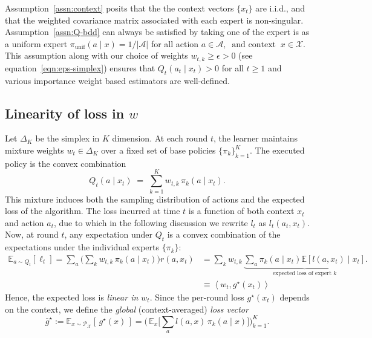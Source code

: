 \documentclass[11pt,letterpaper]{article}
\newcommand{\mycomment}[1]{\textcolor{mypurple}{[#1]}}
\newcommand{\Exs}{\mathbb{E}}
\newcommand{\loss}{\ell}
\theoremstyle{plain}
\theoremstyle{definition}  %
\begin{document}
Assumption~\ref{assn:context} posits that the the context vectors $\{x_t\}$ are i.i.d., and that the weighted covariance matrix associated with each expert is non-singular. Assumption~\ref{assn:Q-bdd} can always be satisfied by taking one of the expert is as a uniform expert $\pi_{\mathrm{unif}}(a \mid x) = 1/|\mathcal{A}|$ for all action $a \in \mathcal{A}, \;\;  \text{and context} \;\; x \in \mathcal{X}$. This assumption along with our choice of weights $w_{t,k} \geq \epsilon > 0$ (see equation~\eqref{eqn:eps-simplex}) ensures that $Q_t(a_t \mid x_t) > 0$ for all $t \geq 1$ and various importance weight based estimators are well-defined. 


\subsection{Linearity of loss in $w$}
%
Let $\Delta_K$ be the simplex in $K$ dimension. At each round $t$, the learner maintains mixture weights $w_t \in \Delta_K$ over a fixed set of base policies $\{\pi_k\}_{k=1}^K$.
The executed policy is the convex combination
\begin{equation}
    Q_t(a \mid x_t)
    \;=\;
    \sum_{k=1}^{K} w_{t,k}\,\pi_k(a \mid x_t).
    \label{eq:mixture-policy}
\end{equation}
This mixture induces both the sampling distribution of actions and the expected loss of the algorithm.
The loss incurred at time $t$ is a function of both context $x_t$ and action $a_t$, due to which in the following discussion we rewrite $l_t$ as $l_t(a_t,x_t)$. Now,
at round $t$, any expectation under $Q_t$ is a convex combination of the expectations under the individual experts $\{\pi_k\}$:
\begin{align}
    \mathbb{E}_{a \sim Q_t}[\loss_t]
    = \sum_{a}\Big(\sum_{k} w_{t,k}\,\pi_k(a \mid x_t)\Big)r(a,x_t)
      &= \sum_{k} w_{t,k}\,\underbrace{\sum_{a}\pi_k(a \mid x_t)\Exs[ l(a,x_t) \mid x_t]}_{\text{expected loss of expert }k}. \\
    &\equiv\left\langle w_t, g^\star(x_t) \right\rangle   
\end{align}
Hence, the expected loss is \emph{linear in $w_t$}.  Since the per-round loss $g^\star(x_t)$ depends on the context, we define the \emph{global} (context-averaged) \emph{loss vector}
\begin{equation}
    \bar g^\star
    := \mathbb{E}_{x\sim\mathcal{P_X}}[\,g^\star(x)\,]
    = \Big(\,\mathbb{E}_{x}\!\big[\sum_a l(a,x)\,\pi_k(a\mid x)\big]\Big)_{k=1}^K.
    \label{eq:gbar-def}
\end{equation}
\end{document}
